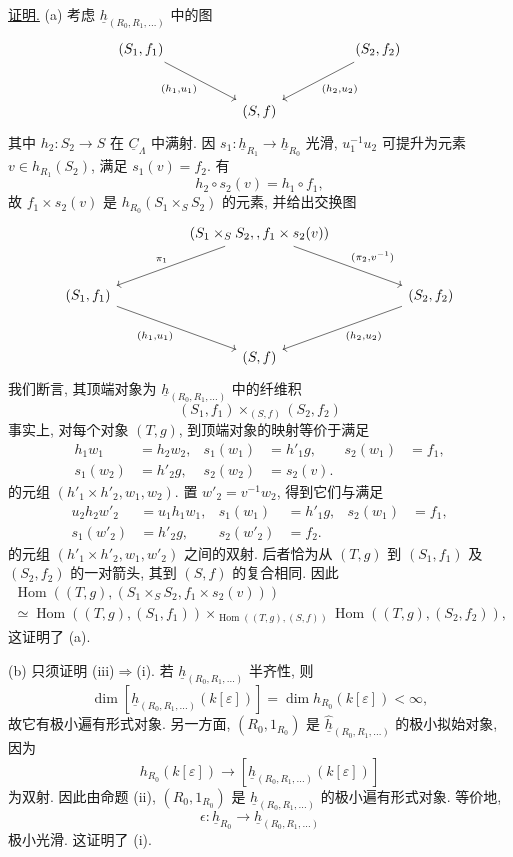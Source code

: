 \underline{证明.} (a) 考虑 $\underline h_{(R_0,R_1,\ldots)}$ 中的图
\[
\begin{tikzcd}[column sep=huge,row sep=large]
 (S_1,f_1) \arrow[dr,"{(h_1,u_1)}"']
 && (S_2,f_2) \arrow[dl,"{(h_2,u_2)}"]\\
 & (S,f) &
\end{tikzcd}
\]
其中 $h_2:S_2\longrightarrow S$ 在 $\underline C_\Lambda$ 中满射.
因 $s_1:\underline h_{R_1}\longrightarrow\underline h_{R_0}$ 光滑,
$u_1^{-1}u_2$ 可提升为元素 $v\in h_{R_1}(S_2)$, 满足 $s_1(v)=f_2$.
有
\[
 h_2\circ s_2(v)=h_1\circ f_1,
\]
故 $f_1\times s_2(v)$ 是 $h_{R_0}(S_1\times_SS_2)$ 的元素, 并给出交换图
\[
\begin{tikzcd}[column sep=huge,row sep=large]
 & (S_1\times_SS_2,,f_1\times s_2(v))
   \arrow[dl,"{\pi_1}"']
   \arrow[dr,"{(\pi_2,v^{-1})}"] &\\
 (S_1,f_1) \arrow[dr,"{(h_1,u_1)}"']
 && (S_2,f_2) \arrow[dl,"{(h_2,u_2)}"]\\
 & (S,f) &
\end{tikzcd}
\]
我们断言, 其顶端对象为 $\underline h_{(R_0,R_1,\ldots)}$ 中的纤维积
\[
 (S_1,f_1)\times_{(S,f)}(S_2,f_2)
\]
事实上, 对每个对象 $(T,g)$, 到顶端对象的映射等价于满足
\begin{align*}
 h_1w_1&=h_2w_2,&
 s_1(w_1)&=h'_1g,&s_2(w_1)&=f_1,\\
 s_1(w_2)&=h'_2g,&
 s_2(w_2)&=s_2(v).
\end{align*}
的元组 $(h'_1\times h'_2,w_1,w_2)$.
置 $w'_2=v^{-1}w_2$, 得到它们与满足
\begin{align*}
 u_2h_2w'_2&=u_1h_1w_1,&
 s_1(w_1)&=h'_1g,&s_2(w_1)&=f_1,\\
 s_1(w'_2)&=h'_2g,&
 s_2(w'_2)&=f_2.
\end{align*}
的元组 $(h'_1\times h'_2,w_1,w'_2)$ 之间的双射.
后者恰为从 $(T,g)$ 到 $(S_1,f_1)$ 及 $(S_2,f_2)$ 的一对箭头,
其到 $(S,f)$ 的复合相同. 因此
\begin{multline*}
 \operatorname{Hom}((T,g),(S_1\times_SS_2,
                 f_1\times s_2(v)))\\
 \simeq
 \operatorname{Hom}((T,g),(S_1,f_1))
 \times_{\operatorname{Hom}((T,g),(S,f))}
 \operatorname{Hom}((T,g),(S_2,f_2)),
\end{multline*}
这证明了 (a).


(b) 只须证明 (iii)$\Rightarrow$(i).
若 $\underline h_{(R_0,R_1,\ldots)}$ 半齐性, 则
\[
 \dim[\underline h_{(R_0,R_1,\ldots)}(k[\varepsilon])]
 =\dim h_{R_0}(k[\varepsilon])<\infty,
\]
故它有极小遍有形式对象. 另一方面,
$(R_0,1_{R_0})$ 是 $\widehat{\underline h}_{(R_0,R_1,\ldots)}$
的极小拟始对象, 因为
\[
 h_{R_0}(k[\varepsilon])
 \longrightarrow
 [\underline h_{(R_0,R_1,\ldots)}(k[\varepsilon])]
\]
为双射. 因此由命题 (ii),
$(R_0,1_{R_0})$ 是 $\underline h_{(R_0,R_1,\ldots)}$ 的极小遍有形式对象.
等价地,
\[
 \epsilon:\underline h_{R_0}
 \longrightarrow\underline h_{(R_0,R_1,\ldots)}
\]
极小光滑. 这证明了 (i).

